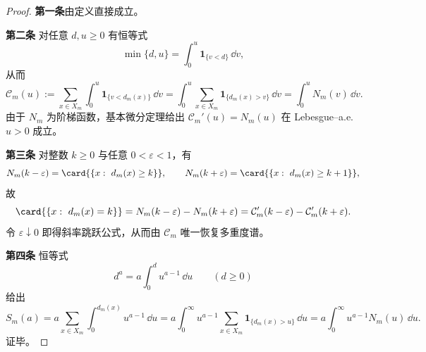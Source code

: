 \begin{proof}
\textbf{第一条}由定义直接成立。
\par
\textbf{第二条}
对任意 \(d,u\ge 0\) 有恒等式
\[
\min\{d,u\}=\int_{0}^{u}\mathbf 1_{\{v<d\}}\,\dd v,
\]
从而
\[
\mathcal{C}_m(u)
:=\sum_{x\in X_m}\int_{0}^{u}\mathbf 1_{\{v<d_m(x)\}}\,\dd v
=\int_{0}^{u}\sum_{x\in X_m}\mathbf 1_{\{d_m(x)>v\}}\,\dd v
=\int_{0}^{u}N_m(v)\,\dd v.
\]
由于 \(N_m\) 为阶梯函数，基本微分定理给出 \(\mathcal{C}_m'(u)=N_m(u)\) 在 Lebesgue--a.e.\ \(u>0\) 成立。
\par
\textbf{第三条}
对整数 \(k\ge 0\) 与任意 \(0<\varepsilon<1\)，有
\[
N_m(k-\varepsilon)=\card{\{x:\ d_m(x)\ge k\}},
\qquad
N_m(k+\varepsilon)=\card{\{x:\ d_m(x)\ge k+1\}},
\]
故
\[
\card{\{x:\ d_m(x)=k\}}=N_m(k-\varepsilon)-N_m(k+\varepsilon)
=\mathcal{C}_m'(k-\varepsilon)-\mathcal{C}_m'(k+\varepsilon).
\]
令 \(\varepsilon\downarrow 0\) 即得斜率跳跃公式，从而由 \(\mathcal{C}_m\) 唯一恢复多重度谱。
\par
\textbf{第四条}
恒等式
\[
d^a=a\int_{0}^{d}u^{a-1}\,\dd u\qquad(d\ge 0)
\]
给出
\[
S_m(a)
=a\sum_{x\in X_m}\int_{0}^{d_m(x)}u^{a-1}\,\dd u
=a\int_{0}^{\infty}u^{a-1}\sum_{x\in X_m}\mathbf 1_{\{d_m(x)>u\}}\,\dd u
=a\int_{0}^{\infty}u^{a-1}N_m(u)\,\dd u.
\]
证毕。
\end{proof}

\endinput
